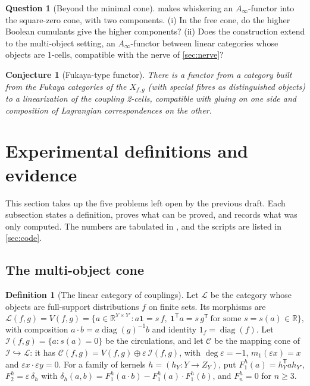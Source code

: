 \documentclass[11pt]{article}
\newtheorem{conjecture}[theorem]{Conjecture}
\theoremstyle{definition}
\newtheorem{definition}[theorem]{Definition}
\newtheorem{question}[theorem]{Question}
\theoremstyle{remark}
\begin{document}
\begin{question}[Beyond the minimal cone]\label{conj:ainfty}
 makes whiskering an $A_\infty$-functor into the square-zero cone, with two components. (i) In the free cone,
do the higher Boolean cumulants give the higher components? (ii) Does the construction extend to the
multi-object setting, an $A_\infty$-functor between linear categories whose objects are 1-cells, compatible with the
nerve of \cref{sec:nerve}?
\end{question}

\begin{conjecture}[Fukaya-type functor]\label{conj:fukaya}
There is a functor from a category built from the Fukaya categories of the $X_{f,g}$ (with special
fibres as distinguished objects) to a linearization of the coupling 2-cells, compatible with gluing on
one side and composition of Lagrangian correspondences on the other.
\end{conjecture}

\section{Experimental definitions and evidence}\label{sec:experimental}

This section takes up the five problems left open by the previous draft. Each subsection states a definition,
proves what can be proved, and records what was only computed. The numbers are tabulated in
\cite[\S13]{Awasthi-Family}, and the scripts are listed in \cref{sec:code}.

\subsection{The multi-object cone}\label{sec:multicone}

\begin{definition}[The linear category of couplings]\label{def:Lcat}
Let $\mathcal L$ be the category whose objects are full-support distributions $f$ on finite sets. Its morphisms are
\[
\mathcal L(f,g)=V(f,g)=\{a\in\mathbb R^{Y\times Y'}: a\mathbf 1=s\,f,\ \mathbf 1^{\mathsf T}a=s\,g^{\mathsf T}\ \text{for some }s=s(a)\in\mathbb R\},
\]
with composition $a\cdot b=a\operatorname{diag}(g)^{-1}b$ and identity $1_f=\operatorname{diag}(f)$. Let $\mathcal I(f,g)=\{a: s(a)=0\}$
be the circulations, and let $\mathcal C$ be the mapping cone of $\mathcal I\hookrightarrow\mathcal L$: it has
$\mathcal C(f,g)=V(f,g)\oplus\varepsilon\,\mathcal I(f,g)$, with $\deg\varepsilon=-1$, $m_1(\varepsilon x)=x$ and
$\varepsilon x\cdot\varepsilon y=0$. For a family of kernels $h=(h_Y\colon Y\to Z_Y)$, put $F^h_1(a)=h_Y^{\mathsf T}ah_{Y'}$,
$F^h_2=\varepsilon\,\delta_h$ with $\delta_h(a,b)=F_1^h(a\cdot b)-F_1^h(a)\cdot F_1^h(b)$, and $F^h_n=0$ for $n\ge3$.
\end{definition}
\end{document}
